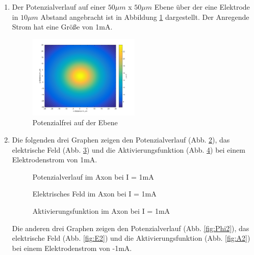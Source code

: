 \documentclass[conference]{IEEEtran}
\begin{document}
\begin{enumerate}
\item Der Potenzialverlauf auf einer $50\mu m$ x $50\mu m$ Ebene über der eine Elektrode in $10\mu m$ Abstand angebracht ist in Abbildung \ref{fig:potField} dargestellt. Der Anregende Strom hat eine Größe von 1mA.

\begin{figure}[h]
	\centering
	\includegraphics[width=0.5\textwidth]{img/potField.png}
	\caption{Potenzialfrei auf der Ebene}
	\label{fig:potField}
\end{figure}

\item Die folgenden drei Graphen zeigen den Potenzialverlauf (Abb. \ref{fig:Phi1}), das elektrische Feld (Abb. \ref{fig:E1}) und die Aktivierungsfunktion (Abb. \ref{fig:A1}) bei einem Elektrodenstrom von 1mA.\\

\begin{figure}[h!]
  	\centering
    \scalebox{.5}{}
    \vspace{-10pt}
    \caption{Potenzialverlauf im Axon bei I = 1mA}
    \vspace{-10pt}
    \label{fig:Phi1}
\end{figure}
\begin{figure}[h!]
  	\centering
    \scalebox{.5}{}
    \vspace{-10pt}
    \caption{Elektrisches Feld im Axon bei I = 1mA}
    \vspace{-10pt}
    \label{fig:E1}
\end{figure}
\begin{figure}[h!]
  	\centering
    \scalebox{.5}{}
    \vspace{-10pt}
    \caption{Aktivierungsfunktion im Axon bei I = 1mA}
    \vspace{-10pt}
    \label{fig:A1}
\end{figure}

Die anderen drei Graphen zeigen den Potenzialverlauf (Abb. \ref{fig:Phi2}), das elektrische Feld (Abb. \ref{fig:E2}) und die Aktivierungsfunktion (Abb. \ref{fig:A2}) bei einem Elektrodenstrom von -1mA.


\end{enumerate}
\end{document}
